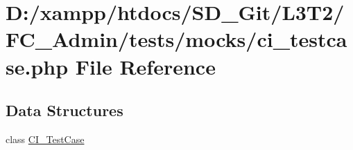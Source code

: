 \hypertarget{_admin_2tests_2mocks_2ci__testcase_8php}{}\section{D\+:/xampp/htdocs/\+S\+D\+\_\+\+Git/\+L3\+T2/\+F\+C\+\_\+\+Admin/tests/mocks/ci\+\_\+testcase.php File Reference}
\label{_admin_2tests_2mocks_2ci__testcase_8php}
\subsection*{Data Structures}
\begin{DoxyCompactItemize}
\item 
class \hyperlink{class_c_i___test_case}{C\+I\+\_\+\+Test\+Case}
\end{DoxyCompactItemize}
